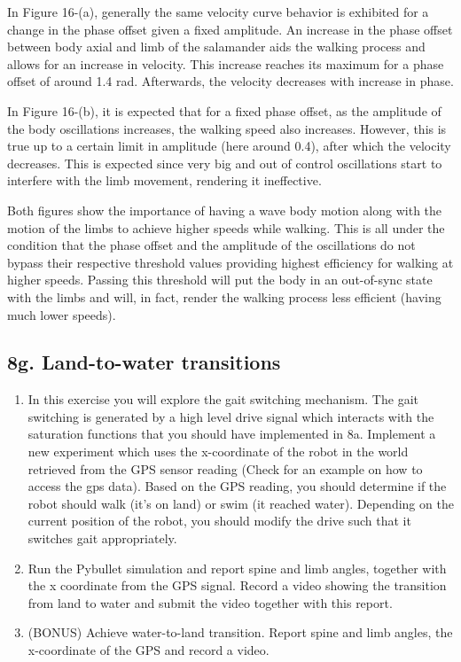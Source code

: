 \documentclass{cmc}
\begin{document}
In Figure 16-(a), generally the same velocity curve behavior is exhibited for a change in the phase offset given a fixed amplitude. An increase in the phase offset between body axial and limb of the salamander aids the walking process and allows for an increase in velocity. This increase reaches its maximum for a phase offset of around 1.4 rad. Afterwards, the velocity decreases with increase in phase. 

In Figure 16-(b), it is expected that for a fixed phase offset, as the amplitude of the body oscillations increases, the walking speed also increases. However, this is true up to a certain limit in amplitude (here around 0.4), after which the velocity decreases. This is expected since very big and out of control oscillations start to interfere with the limb movement, rendering it ineffective. 



Both figures show the importance of having a wave body motion along with the motion of the limbs to achieve higher speeds while walking. This is all under the condition that the phase offset and the amplitude of the oscillations do not bypass their respective threshold values providing highest efficiency for walking at higher speeds. Passing this threshold will put the body in an out-of-sync state with the limbs and will, in fact, render the walking process less efficient (having much lower speeds). 

\subsection*{8g. Land-to-water transitions}

\begin{enumerate}
\item In this exercise you will explore the gait switching mechanism. The gait
  switching is generated by a high level drive signal which interacts with the
  saturation functions that you should have implemented in 8a. Implement a new
  experiment which uses the x-coordinate of the robot in the world retrieved
  from the GPS sensor reading (Check  for an example on how
  to access the gps data). Based on the GPS reading,
  you should determine if the robot should walk (it’s on land) or swim (it
  reached water). Depending on the current position of the robot, you should
  modify the drive such that it switches gait appropriately.
\item Run the Pybullet simulation and report spine and limb angles, together with
  the x coordinate from the GPS signal. Record a video showing the transition
  from land to water and submit the video together with this report.
\item (BONUS) Achieve water-to-land transition. Report spine and limb angles,
  the x-coordinate of the GPS and record a video.
\end{enumerate}
\end{document}
